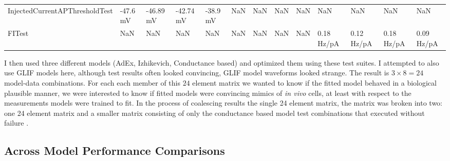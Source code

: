 \begin{table}
{\begin{tabular}{lllllllllllll}
InjectedCurrentAPThresholdTest &                       -47.6 mV &                -46.89 mV &                          -42.74 mV &     -38.9 mV &            NaN &            NaN &            NaN &            NaN &         NaN &         NaN &         NaN &         NaN \\
FITest                         &                            NaN &                      NaN &                                NaN &          NaN &            NaN &            NaN &            NaN &            NaN &  0.18 Hz/pA &  0.12 Hz/pA &  0.18 Hz/pA &  0.09 Hz/pA \\
\bottomrule
\end{tabular}}
\end{table}
\label{table:tests_derived_from_reports}

I then used three different models (AdEx, Izhikevich, Conductance based) and optimized them using these test suites. I attempted to also use GLIF models here, although test results often looked convincing, GLIF model waveforms looked strange.
The result is $3 \times 8 = 24$ model-data combinations.
For each each member of this $24$ element matrix we wanted to know if the fitted model behaved in a biological plausible manner, we were interested to know if fitted models were convincing mimics of \emph{in vivo} cells, at least with respect to the measurements models were trained to fit.
In the process of coalescing results the single 24 element matrix, the matrix was broken into two: one 24 element matrix %
and a smaller matrix consisting of only the conductance based model test combinations that executed without failure . 

\subsection{Across Model Performance Comparisons}

